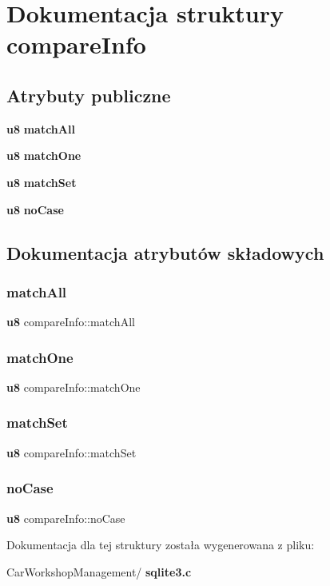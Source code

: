 \section{Dokumentacja struktury compare\+Info}
\label{structcompare_info}
\subsection*{Atrybuty publiczne}
\begin{DoxyCompactItemize}
\item 
\textbf{ u8} \textbf{ match\+All}
\item 
\textbf{ u8} \textbf{ match\+One}
\item 
\textbf{ u8} \textbf{ match\+Set}
\item 
\textbf{ u8} \textbf{ no\+Case}
\end{DoxyCompactItemize}


\subsection{Dokumentacja atrybutów składowych}
\mbox{\label{structcompare_info_a1161e850029ef556e6daee856d32b2e2}} 
\subsubsection{matchAll}
{\footnotesize\ttfamily \textbf{ u8} compare\+Info\+::match\+All}

\mbox{\label{structcompare_info_ab9aabbf6d3df26bad786b532330a2fd7}} 
\subsubsection{matchOne}
{\footnotesize\ttfamily \textbf{ u8} compare\+Info\+::match\+One}

\mbox{\label{structcompare_info_a5d2ff58a72c9eb7d22f18915c1751655}} 
\subsubsection{matchSet}
{\footnotesize\ttfamily \textbf{ u8} compare\+Info\+::match\+Set}

\mbox{\label{structcompare_info_a6de76861b066547321f7a255cb7042ab}} 
\subsubsection{noCase}
{\footnotesize\ttfamily \textbf{ u8} compare\+Info\+::no\+Case}



Dokumentacja dla tej struktury została wygenerowana z pliku\+:\begin{DoxyCompactItemize}
\item 
Car\+Workshop\+Management/\textbf{ sqlite3.\+c}\end{DoxyCompactItemize}
